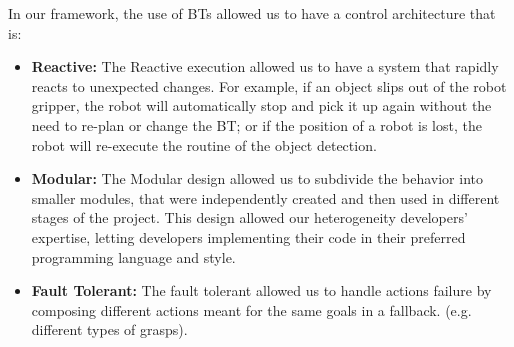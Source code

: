%
%
%
%
%
%
In our framework, the use of BTs allowed us to have a control architecture that is:

\begin{itemize}
\item \textbf{Reactive:} The Reactive execution allowed us to have a system that rapidly reacts to unexpected changes. For example, if an object slips out of the robot gripper, the robot will automatically stop and pick it up again without the need to re-plan or change the BT; or if the position of a robot is lost, the robot will re-execute the routine of the object detection.
\item \textbf{Modular:} The Modular design allowed us to subdivide the behavior into smaller modules, that were independently created and then used in different stages of the project. This design allowed our heterogeneity developers’ expertise, letting developers implementing their code in their preferred programming language and style.
\item \textbf{Fault Tolerant:} The fault tolerant allowed us to handle actions failure by composing different actions meant for the same goals in a fallback. (e.g. different types of grasps).
\end{itemize}



